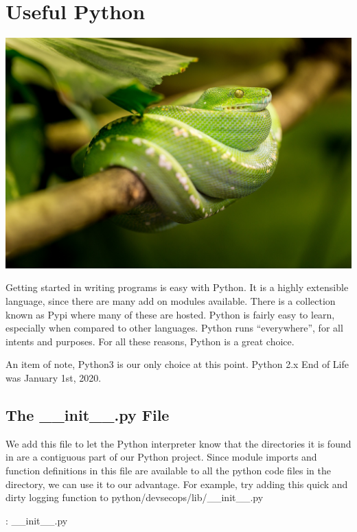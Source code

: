 \chapter{Useful Python}

\includegraphics[scale=0.85]{images/snake-1634293_1920.jpg}

\justify{}
Getting started in writing programs is easy with Python. It is a highly 
extensible language, since there are many add on modules available. 
There is a collection known as Pypi where many of these are hosted.
Python is fairly easy to learn, especially when compared to other languages.
Python runs ``everywhere'', for all intents and purposes. For all these reasons,
Python is a great choice.

\justify{}
An item of note, Python3 is our only choice at this point. Python 2.x End of Life was
January 1st, 2020.

\section{The \_\_init\_\_.py File}

\justify{}
We add this file to let the Python interpreter know that the directories
it is found in are a contiguous part of our Python project. Since module
imports and function definitions in this file are available to all the
python code files in the directory, we can use it to our advantage. For
example, try adding this quick and dirty logging function to
python/devsecops/lib/\_\_init\_\_.py

\justify{}
\begin{mybox}{\thetcbcounter: \_\_init\_\_.py}
  
\end{mybox}

